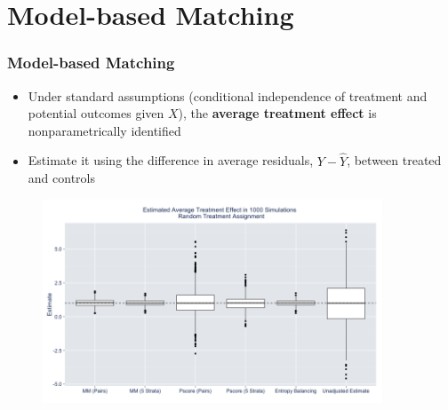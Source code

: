 \documentclass{beamer}
\begin{document}
\section[Model-based Matching]{Model-based Matching}
\frame
{
  \frametitle{Model-based Matching}
\begin{center}
\begin{itemize}
\item Under standard assumptions (conditional independence of treatment and potential outcomes given $X$), the \textbf{average treatment effect} is nonparametrically identified
\item Estimate it using the difference in average residuals, $Y - \hat{Y}$, between treated and controls
\end{itemize}

\begin{figure}[htbp]
\begin{center}
\includegraphics[width = 0.9\textwidth]{fig/estimates.png}

\end{center}
\end{figure}


\end{center}
}
\end{document}
